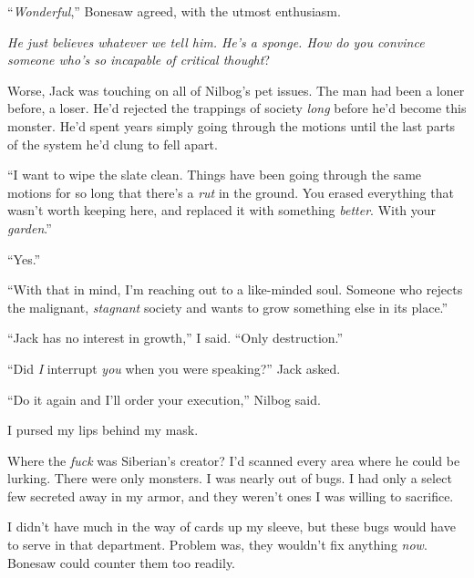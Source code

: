 ``\emph{Wonderful},'' Bonesaw agreed, with the utmost enthusiasm.



\emph{He just believes whatever we tell him.  He's a sponge.  How do you convince someone who's so incapable of critical thought}?



Worse, Jack was touching on all of Nilbog's pet issues.  The man had been a loner before, a loser.  He'd rejected the trappings of society \emph{long} before he'd become this monster.  He'd spent years simply going through the motions until the last parts of the system he'd clung to fell apart.



``I want to wipe the slate clean.  Things have been going through the same motions for so long that there's a \emph{rut} in the ground.  You erased everything that wasn't worth keeping here, and replaced it with something \emph{better}.  With your \emph{garden}.''



``Yes.''



``With that in mind, I'm reaching out to a like-minded soul.  Someone who rejects the malignant, \emph{stagnant} society and wants to grow something else in its place.''



``Jack has no interest in growth,'' I said.  ``Only destruction.''



``Did \emph{I} interrupt \emph{you} when you were speaking?'' Jack asked.



``Do it again and I'll order your execution,'' Nilbog said.



I pursed my lips behind my mask.



Where the \emph{fuck} was Siberian's creator?  I'd scanned every area where he could be lurking.  There were only monsters.  I was nearly out of bugs.  I had only a select few secreted away in my armor, and they weren't ones I was willing to sacrifice.



I didn't have much in the way of cards up my sleeve, but these bugs would have to serve in that department.  Problem was, they wouldn't fix anything \emph{now}.  Bonesaw could counter them too readily.



